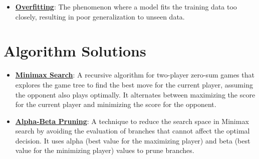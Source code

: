 \documentclass{article}%
\begin{document}
\begin{itemize}[leftmargin=*]
\item \href{\url{https://purdue.brightspace.com/d2l/common/assets/pdfjs-d2l-dist/1.0.14-legacy/web/viewer.html?file=\%252Fcontent\%252Fenforced\%252F1095467-wl.202510.CS.24300.001\%252F05L2-ML\%20Basics.pdf\%253Fou\%253D1095467\&lang=en-us\&container=d2l-fileviewer-rendered-pdf\&fullscreen=d2l-fileviewer-rendered-pdf-dialog\&height=667}#page=14}{\textbf{Overfitting}}: The phenomenon where a model fits the training data too closely, resulting in poor generalization to unseen data.%
\end{itemize}

%
\section{Algorithm Solutions}%
\label{sec:AlgorithmSolutions}%
\begin{itemize}[leftmargin=*]%
\item \href{\url{https://purdue.brightspace.com/d2l/common/assets/pdfjs-d2l-dist/1.0.14-legacy/web/viewer.html?file=\%252Fcontent\%252Fenforced\%252F1095467-wl.202510.CS.24300.001\%252F02L2-Intro.pdf\%253Fou\%253D1095467\&lang=en-us\&container=d2l-fileviewer-rendered-pdf\&fullscreen=d2l-fileviewer-rendered-pdf-dialog\&height=667}#page=22}{\textbf{Minimax Search}}: A recursive algorithm for two-player zero-sum games that explores the game tree to find the best move for the current player, assuming the opponent also plays optimally. It alternates between maximizing the score for the current player and minimizing the score for the opponent.%
\item \href{\url{https://purdue.brightspace.com/d2l/common/assets/pdfjs-d2l-dist/1.0.14-legacy/web/viewer.html?file=\%252Fcontent\%252Fenforced\%252F1095467-wl.202510.CS.24300.001\%252F02L2-Intro.pdf\%253Fou\%253D1095467\&lang=en-us\&container=d2l-fileviewer-rendered-pdf\&fullscreen=d2l-fileviewer-rendered-pdf-dialog\&height=667}#page=23}{\textbf{Alpha{-}Beta Pruning}}: A technique to reduce the search space in Minimax search by avoiding the evaluation of branches that cannot affect the optimal decision. It uses alpha (best value for the maximizing player) and beta (best value for the minimizing player) values to prune branches.%
\end{itemize}%
\end{document}
